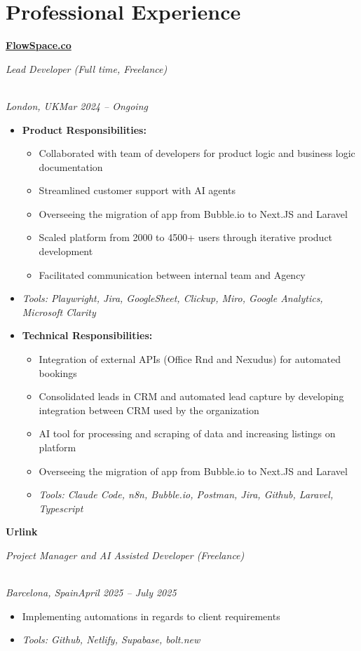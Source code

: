 \documentclass[a4paper,10pt]{article}
\newcommand{\role}[4]{\vspace{3pt}\noindent\hspace{0.6em}\parbox[t]{0.38\textwidth}{\raggedright\textbf{#1}}\hfill\parbox[t]{0.58\textwidth}{\raggedleft\textit{#2}}\\{\textit{#3}\hfill\textit{#4}}\vspace{1pt}}
\begin{document}
\section{Professional Experience}
\role{\href{https://flowspace.co}{FlowSpace.co}}{Lead Developer (Full time, Freelance)}{London, UK}{Mar 2024 -- Ongoing}
\begin{itemize}
\item \textbf{Product Responsibilities:}
\begin{itemize}[label=--]
\item Collaborated with team of developers for product logic and business logic documentation
\item Streamlined customer support with AI agents
\item Overseeing the migration of app from Bubble.io to Next.JS and Laravel
\item Scaled platform from 2000 to 4500+ users through iterative product development
\item Facilitated communication between internal team and Agency
\end{itemize}
\item \textit{Tools: Playwright, Jira, GoogleSheet, Clickup, Miro, Google Analytics, Microsoft Clarity}
\item \textbf{Technical Responsibilities:}
\begin{itemize}[label=--]
\item Integration of external APIs (Office Rnd and Nexudus) for automated bookings
\item Consolidated leads in CRM and automated lead capture by developing integration between CRM used by the organization
\item AI tool for processing and scraping of data and increasing listings on platform
\item Overseeing the migration of app from Bubble.io to Next.JS and Laravel
\item \textit{Tools: Claude Code, n8n, Bubble.io, Postman, Jira, Github, Laravel, Typescript}
\end{itemize}
\end{itemize}

\role{Urlink}{Project Manager and AI Assisted Developer (Freelance)}{Barcelona, Spain}{April 2025 -- July 2025}
\begin{itemize}
\item Implementing automations in regards to client requirements
\item \textit{Tools: Github, Netlify, Supabase, bolt.new}
\end{itemize}
\end{document}
